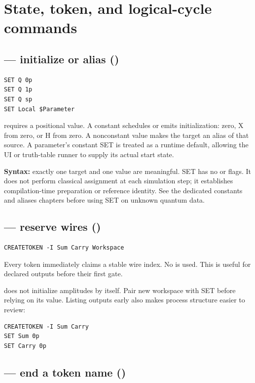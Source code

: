 \section{State, token, and logical-cycle commands}

\subsection{ --- initialize or alias (\implemented)}

\begin{lstlisting}
SET Q 0p
SET Q 1p
SET Q sp
SET Local $Parameter
\end{lstlisting}
 requires a positional value. A constant schedules or
emits initialization: zero, X from zero, or H from zero. A nonconstant value
makes the target an alias of that source. A  parameter's constant
SET is treated as a runtime default, allowing the UI or truth-table runner to
supply its actual start state.

\textbf{Syntax:} exactly one target and one value are meaningful. SET has no
 or  flags. It does not perform classical assignment at each
simulation step; it establishes compilation-time preparation or reference
identity. See the dedicated constants and aliases chapters before using SET on
unknown quantum data.

\subsection{ --- reserve wires (\implemented)}

\begin{lstlisting}
CREATETOKEN -I Sum Carry Workspace
\end{lstlisting}
Every  token immediately claims a stable wire index. No  is
used. This is useful for declared outputs before their first gate.

 does not initialize amplitudes by itself. Pair new workspace
with SET before relying on its value. Listing outputs early also makes process
structure easier to review:
\begin{lstlisting}
CREATETOKEN -I Sum Carry
SET Sum 0p
SET Carry 0p
\end{lstlisting}

\subsection{ --- end a token name (\implemented)}

